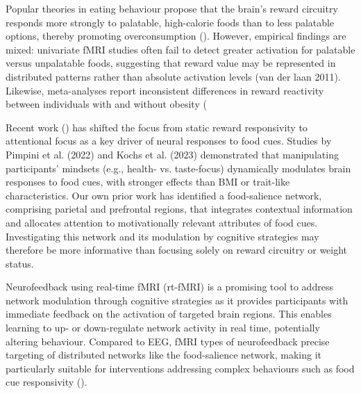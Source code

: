 \documentclass[]{imag-ms-template}
\begin{document}
Popular theories in eating behaviour propose that the brain’s reward circuitry responds more strongly to palatable, high-calorie foods than to less palatable options, thereby promoting overconsumption (\cite{hillObesityOverviewEpidemic2005}). However, empirical findings are mixed: univariate fMRI studies often fail to detect greater activation for palatable versus unpalatable foods, suggesting that reward value may be represented in distributed patterns rather than absolute activation levels (van der laan 2011). 
Likewise, meta-analyses report inconsistent differences in reward reactivity between individuals with and without obesity (%

Recent work  (\cite{frankortRewardActivitySatiated2012, franssenPowerMindAttentional2020, franssenEffectsMindsetHormonal2022, pimpiniMoreComplexYou2022, kochsItMatterPerspective2023}) has shifted the focus from static reward responsivity to attentional focus as a key driver of neural responses to food cues. Studies by Pimpini et al. (2022) and Kochs et al. (2023) demonstrated that manipulating participants’ mindsets (e.g., health- vs. taste-focus) dynamically modulates brain responses to food cues, with stronger effects than BMI or trait-like characteristics. Our own prior work has identified a food-salience network, comprising parietal and prefrontal regions, that integrates contextual information and allocates attention to motivationally relevant attributes of food cues. Investigating this network and its modulation by cognitive strategies may therefore be more informative than focusing solely on reward circuitry or weight status.

Neurofeedback using real-time fMRI (rt-fMRI) is a promising tool to address network modulation through cognitive strategies as it provides participants with immediate feedback on the activation of targeted brain regions. This enables learning to up- or down-regulate network activity in real time, potentially altering behaviour. Compared to EEG, fMRI types of neurofeedback  precise targeting of distributed networks like the food-salience network, making it particularly suitable for interventions addressing complex behaviours such as food cue responsivity (\cite{pimpiniMoreComplexYou2022, kochsItMatterPerspective2023}).
\end{document}

